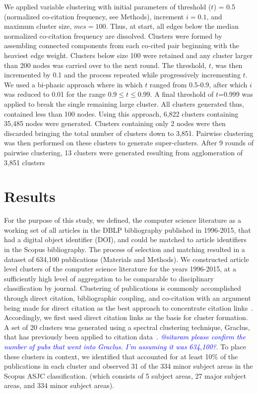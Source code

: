 We applied variable clustering with initial parameters of threshold ($t$) = 0.5 (normalized co-citation frequency, see Methods), increment $i = 0.1$, and maximum cluster size, $mcs = 100$. Thus, at start, all edges below the median normalized co-citation frequency are dissolved. Clusters were formed by assembling connected components from each co-cited pair beginning with the heaviest edge weight. Clusters below size 100 were retained and any cluster larger than 200 nodes was carried over to the next round. The threshold, $t$, was then incremented by 0.1 and the process repeated while progressively incrementing $t$.  We used a bi-phasic approach where in which $t$ ranged from 0.5-0.9, after which $i$ was reduced to 0.01 for the range $0.9 \leq t \leq 0.99$. A final threshold of $t$=0.999 was applied to break the single remaining large cluster. All clusters generated thus, contained  less than 100 nodes.  Using this approach, 6,822 clusters containing 35,485 nodes were generated. Clusters containing only 2 nodes were then discarded bringing the total number of clusters down to 3,851. Pairwise clustering was then performed on these clusters to generate super-clusters. After 9 rounds of pairwise clustering, 13 clusters were generated resulting from agglomeration of 3,851 clusters 


\section{Results}
\label{sec:results}

For the purpose of this study, we defined, the computer science literature as a working set of all articles in the DBLP bibliography published in 1996-2015, that had a digital object identifier (DOI), and could be matched to article identifiers in the Scopus bibliography. The process of selection and matching resulted in a dataset of 634,100 publications (Materials and Methods). We constructed article level clusters of the computer science literature for the years 1996-2015, at a sufficiently high level of aggregation to be comparable to disciplinary classification by journal. Clustering of publications is commonly accomplished through direct citation, bibliographic coupling, and co-citation with an argument being made for direct citation as the best approach to concentrate citation links~\cite{klavans_which_2017}. Accordingly, we first used direct citation links as the basis for cluster formation. A set of 20 clusters was generated using a spectral clustering technique, Graclus, that has previously been applied to citation data~\cite{graclus_2007,subelj_clustering_2016}. 
\textcolor{blue}{
 \emph{@sitaram please confirm the number of pubs that went into Graclus. I'm assuming it was 634,100?}. 
 }To place these clusters in context, we identified that accounted for at least 10\% of the publications in each cluster and observed 31 of the 334 minor subject areas in the Scopus ASJC classification. (which consists of 5 subject areas, 27 major subject areas, and 334 minor subject areas). 

